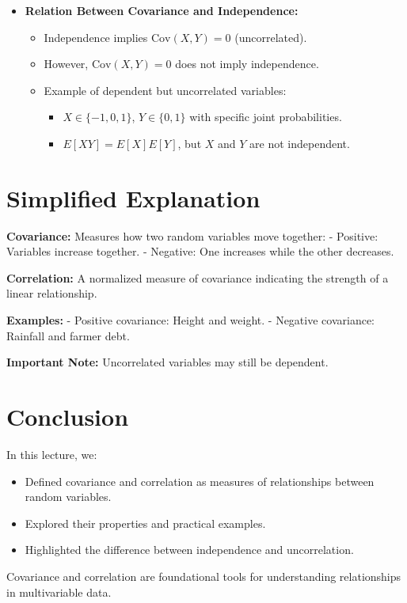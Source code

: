 \documentclass{article}
\begin{document}
\begin{itemize}
  \item \textbf{Relation Between Covariance and Independence:}
    \begin{itemize}
      \item Independence implies $\text{Cov}(X, Y) = 0$ (uncorrelated).
      \item However, $\text{Cov}(X, Y) = 0$ does not imply independence.
      \item Example of dependent but uncorrelated variables:
        \begin{itemize}
          \item $X \in \{-1, 0, 1\}$, $Y \in \{0, 1\}$ with specific joint probabilities.
          \item $E[XY] = E[X]E[Y]$, but $X$ and $Y$ are not independent.
        \end{itemize}
    \end{itemize}
\end{itemize}

\section*{Simplified Explanation}

\textbf{Covariance:}
Measures how two random variables move together:
- Positive: Variables increase together.
- Negative: One increases while the other decreases.

\textbf{Correlation:}
A normalized measure of covariance indicating the strength of a linear relationship.

\textbf{Examples:}
- Positive covariance: Height and weight.
- Negative covariance: Rainfall and farmer debt.

\textbf{Important Note:}
Uncorrelated variables may still be dependent.

\section*{Conclusion}

In this lecture, we:
\begin{itemize}
  \item Defined covariance and correlation as measures of relationships between random variables.
  \item Explored their properties and practical examples.
  \item Highlighted the difference between independence and uncorrelation.
\end{itemize}

Covariance and correlation are foundational tools for understanding relationships in multivariable data.
\end{document}

